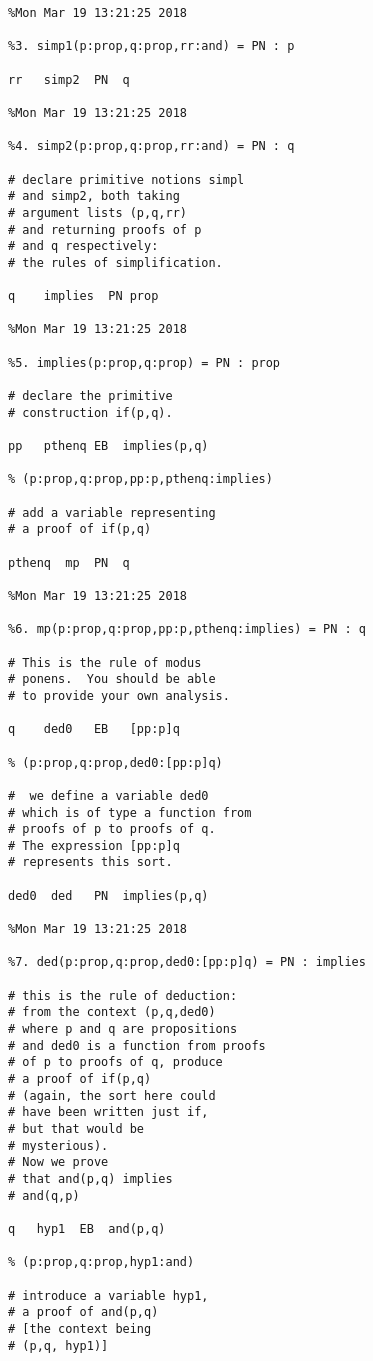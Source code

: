 \documentclass[12pt]{article}
\begin{document}
\begin{verbatim}
%Mon Mar 19 13:21:25 2018

%3. simp1(p:prop,q:prop,rr:and) = PN : p

rr   simp2  PN  q

%Mon Mar 19 13:21:25 2018

%4. simp2(p:prop,q:prop,rr:and) = PN : q

# declare primitive notions simpl
# and simp2, both taking 
# argument lists (p,q,rr)
# and returning proofs of p
# and q respectively:
# the rules of simplification.

q    implies  PN prop

%Mon Mar 19 13:21:25 2018

%5. implies(p:prop,q:prop) = PN : prop

# declare the primitive
# construction if(p,q).

pp   pthenq EB  implies(p,q)

% (p:prop,q:prop,pp:p,pthenq:implies)

# add a variable representing
# a proof of if(p,q)

pthenq  mp  PN  q

%Mon Mar 19 13:21:25 2018

%6. mp(p:prop,q:prop,pp:p,pthenq:implies) = PN : q

# This is the rule of modus
# ponens.  You should be able
# to provide your own analysis.

q    ded0   EB   [pp:p]q

% (p:prop,q:prop,ded0:[pp:p]q)

#  we define a variable ded0
# which is of type a function from
# proofs of p to proofs of q.
# The expression [pp:p]q
# represents this sort.

ded0  ded   PN  implies(p,q)

%Mon Mar 19 13:21:25 2018

%7. ded(p:prop,q:prop,ded0:[pp:p]q) = PN : implies

# this is the rule of deduction:
# from the context (p,q,ded0)
# where p and q are propositions
# and ded0 is a function from proofs
# of p to proofs of q, produce
# a proof of if(p,q)
# (again, the sort here could
# have been written just if,
# but that would be 
# mysterious).
# Now we prove 
# that and(p,q) implies
# and(q,p)

q   hyp1  EB  and(p,q)

% (p:prop,q:prop,hyp1:and)

# introduce a variable hyp1,
# a proof of and(p,q)
# [the context being
# (p,q, hyp1)]


\end{verbatim}
\end{document}
